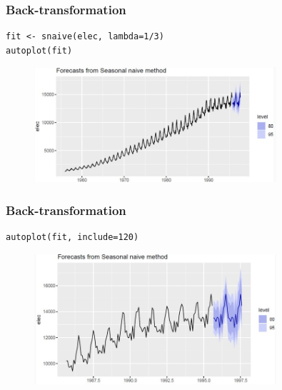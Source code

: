 \documentclass[10pt]{beamer}
\begin{document}



\begin{frame}[fragile]
\frametitle{Back-transformation}


\begin{lstlisting}
fit <- snaive(elec, lambda=1/3)
autoplot(fit)
\end{lstlisting}

\pause


\begin{figure}
\begin{center}
    \includegraphics[width=0.8\textwidth]{Imagen9.JPG}
\end{center}
\end{figure}


\end{frame}






\begin{frame}[fragile]
\frametitle{Back-transformation}


\begin{lstlisting}
autoplot(fit, include=120)
\end{lstlisting}

\pause


\begin{figure}
\begin{center}
    \includegraphics[width=0.8\textwidth]{Imagen10.JPG}
\end{center}
\end{figure}


\end{frame}
\end{document}
